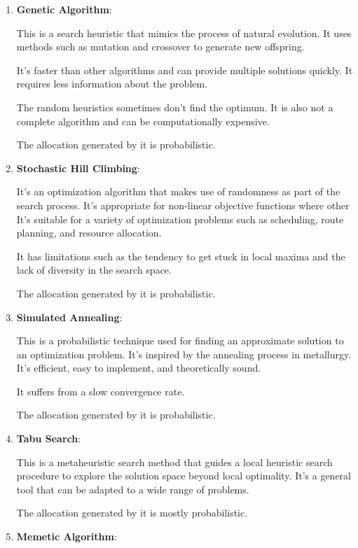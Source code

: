 \begin{enumerate}
  \item \textbf{Genetic Algorithm}:

        This is a search heuristic that mimics the process of natural evolution. It uses methods such as mutation and crossover to generate new offspring.

        It's faster than other algorithms and can provide multiple solutions quickly. It requires less information about the problem.

        The random heuristics sometimes don't find the optimum. It is also not a complete algorithm and can be computationally expensive.

        The allocation generated by it is probabilistic.

  \item \textbf{Stochastic Hill Climbing}:

        It's an optimization algorithm that makes use of randomness as part of the search process. It's appropriate for non-linear objective functions where other
        It's suitable for a variety of optimization problems such as scheduling, route planning, and resource allocation.

        It has limitations such as the tendency to get stuck in local maxima and the lack of diversity in the search space.

        The allocation generated by it is probabilistic.

  \item \textbf{Simulated Annealing}:

        This is a probabilistic technique used for finding an approximate solution to an optimization problem. It's inspired by the annealing process in metallurgy.
        It's efficient, easy to implement, and theoretically sound.

        It suffers from a slow convergence rate.

        The allocation generated by it is probabilistic.

  \item \textbf{Tabu Search}:

        This is a metaheuristic search method that guides a local heuristic search procedure to explore the solution space beyond local optimality.
        It's a general tool that can be adapted to a wide range of problems.

        The allocation generated by it is mostly probabilistic.

  \item \textbf{Memetic Algorithm}:


\end{enumerate}
